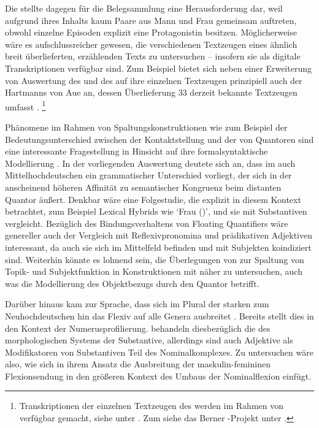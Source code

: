 Die \KC{} stellte dagegen für die Belegsammlung eine Herausforderung
dar, weil aufgrund ihres Inhalts kaum Paare aus Mann und Frau gemeinsam
auftreten, obwohl einzelne Episoden explizit eine Protagonistin besitzen.
Möglicherweise wäre es aufschlussreicher gewesen, die verschiedenen Textzeugen
eines ähnlich breit überlieferten, erzählenden Texts zu untersuchen -- insofern
sie als digitale Transkriptionen verfügbar sind. Zum Beispiel bietet sich neben
einer Erweiterung von  Auswertung des
 und des  auf ihre einzelnen Textzeugen prinzipiell
auch der  Hartmanns von Aue an, dessen Überlieferung 33 derzeit
bekannte Textzeugen umfasst \autocites[vgl.][s.\,v.~\textit{Hartmann von Aue:
}]{hsc}.%
%
	\footnote{Transkriptionen der einzelnen Textzeugen des  werden
		im Rahmen von  verfügbar gemacht, siehe unter
		. Zum  siehe das Berner
		-Projekt unter .%
	}

Phänomene im Rahmen von Spaltungskonstruktionen wie zum Beispiel der
Bedeutungs\-unterschied zwischen der Kontaktstellung und der
 von Quantoren sind eine interessante Fragestellung in
Hinsicht auf ihre formal\-syntaktische Modellierung \autocite[siehe
z.\,B.][]{pittner1995,merchant1996,fanselowcavar2002,nolda2007,shen2019}. In
der vorliegenden Auswertung deutete sich an, dass im auch
Mittelhochdeutschen ein grammatischer Unterschied
vorliegt, der sich in der anscheinend höheren Affinität zu semantischer
Kongruenz beim distanten Quantor äußert. Denkbar wäre eine Folgestudie, die
explizit   in diesem Kontext
betrachtet, zum Beispiel Lexical Hybrids wie  `Frau (\NeutF)', und
sie mit  Substantiven vergleicht. Bezüglich des
Bindungsverhaltens von Floating Quantifiers
wäre genereller auch der Vergleich mit Reflexivpronomina und prädikativen
Adjektiven interessant, da auch sie sich im Mittelfeld
befinden und mit Subjekten koindiziert sind. Weiterhin könnte es lohnend sein,
die Überlegungen von \citet{spector2009} zur Spaltung von Topik- und
Subjektfunktion in Konstruktionen mit  näher zu
untersuchen, auch was die Modellierung des Objektbezugs durch den Quantor
betrifft.

Darüber hinaus kam zur Sprache, dass sich im Plural der starken
 zum Neuhochdeutschen hin das
Flexiv  auf alle Genera ausbreitet
\autocite[vgl.][191--192]{reichmannwegera1993}. Bereits \citet{askedal1973}
stellt dies in den Kontext der Numerusprofilierung. \citet{dammelgillmann2014} behandeln diesbezüglich die 
des morphologischen Systems der Substantive, allerdings sind auch
Adjektive als Modifikatoren von Substantiven Teil des
Nominalkomplexes. Zu untersuchen wäre also, wie sich in ihrem Ansatz die
Ausbreitung der maskulin-femininen Flexionsendung in den größeren Kontext des
Umbaus der Nominal\-flexion einfügt.

